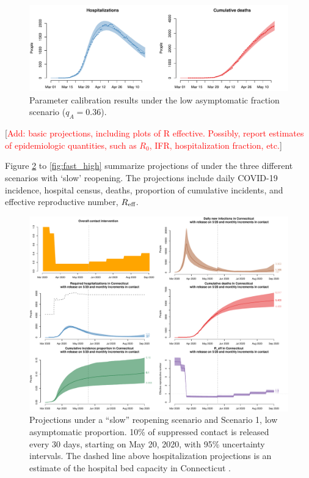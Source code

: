 \documentclass[11pt]{article}
\newcommand{\comments}[1]{[\textcolor{red}{#1}]}
\begin{document}
\begin{figure}[htb]
	\centering
	\includegraphics[width=.8\textwidth]{figures/calibration.pdf}
	\caption{Parameter calibration results under the low asymptomatic fraction scenario ($q_A = 0.36$).}
	\label{fig:fit}
\end{figure}


\comments{Add: basic projections, including plots of R effective. Possibly, report estimates of epidemiologic quantities, such as $R_0$, IFR, hospitalization fraction, etc.}

Figure \ref{fig:slow_low} to \ref{fig:fast_high} summarize projections of under the three different scenarios with `slow' reopening. The projections include daily COVID-19 incidence, hospital census, deaths, proportion of cumulative incidents, and effective reproductive number, $R\textsubscript{eff}$. 


\begin{figure}[htb]
	\centering
	\includegraphics[width=.9\textwidth]{figures/slow_low_full.pdf}
	\caption{Projections under a ``slow'' reopening scenario and Scenario 1, low asymptomatic proportion. 10\% of suppressed contact is released every 30 days, starting on May 20, 2020, with 95\% uncertainty intervals. The dashed line above hospitalization projections is an estimate of the hospital bed capacity in Connecticut \citep{CHAwebsite}. }
	\label{fig:slow_low}
\end{figure}
\end{document}
